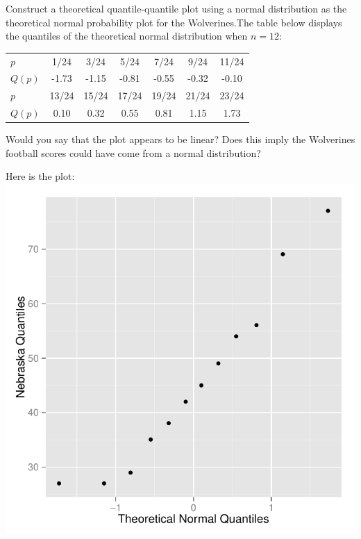 \documentclass[11pt]{article}\usepackage[]{graphicx}\usepackage[]{color}
\makeatletter
\def\maxwidth{ %
  \ifdim\Gin@nat@width>\linewidth
    \linewidth
  \else
    \Gin@nat@width
  \fi
}
\newenvironment{knitrout}{}{} %
\makeatother
\begin{document}
\item Construct a theoretical quantile-quantile plot using a normal distribution as the theoretical normal probability plot for the Wolverines.The table below displays the quantiles of the theoretical normal distribution when $n=12$:

\begin{center}
\begin{tabular}{| l | c c c c c c |}\hline
	$p$ & 1/24 & 3/24 & 5/24 & 7/24 & 9/24 & 11/24\\
	$Q(p)$ & -1.73 & -1.15 & -0.81 & -0.55 & -0.32 & -0.10\\ \hline\hline
	$p$ & 13/24 & 15/24 & 17/24 & 19/24 & 21/24 & 23/24\\
	$Q(p)$ & 0.10 & 0.32 & 0.55 & 0.81 & 1.15 & 1.73\\\hline
\end{tabular}
\end{center}

Would you say that the plot appears to be linear? Does this imply the Wolverines football scores could have come from a normal distribution?


Here is the plot:
\begin{knitrout}
\color{fgcolor}
\includegraphics[width=.5\maxwidth]{figure/unnamed-chunk-3-1} 

\end{knitrout}
\end{document}
